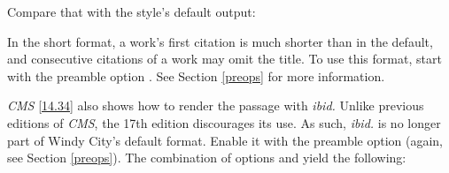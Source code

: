 \documentclass[11pt,letterpaper,oneside]{article}
\begin{document}
Compare that with the style's default output:

\begin{citeonly}
\item \cite[3]{morrison2004a}
\item \cite[18]{morrison2004a}
\item \cite[18]{morrison2004a}
\item \cite[24--26]{morrison2004a}
\item \cite[401-2]{morrison2004b}
\item \cite[433]{morrison2004b}
\item \cite[37--38]{diaz2008}
\item \cite[403]{morrison2004b}
\item \cite[152]{diaz2008}
\item \cite[201-2]{diaz2008}
\item \cites[240]{morrison2004b}[32]{morrison2004a}
\item \cite[33]{morrison2004a}
\end{citeonly}

In the short format, a work's first citation is much shorter than in
the default, and consecutive citations of a work may omit the title.
To use this format, start \biblatex with the preamble option
. See Section \ref{preops} for more information.

\textit{CMS} \ref{14.34} also shows how to render the passage with
\textit{ibid.} Unlike previous editions of \textit{CMS}, the 17th
edition discourages its use. As such, \textit{ibid.} is no longer part
of Windy City's default format. Enable it with the preamble option
 (again, see Section \ref{preops}). The combination of
options  and  yield the following:
\end{document}

